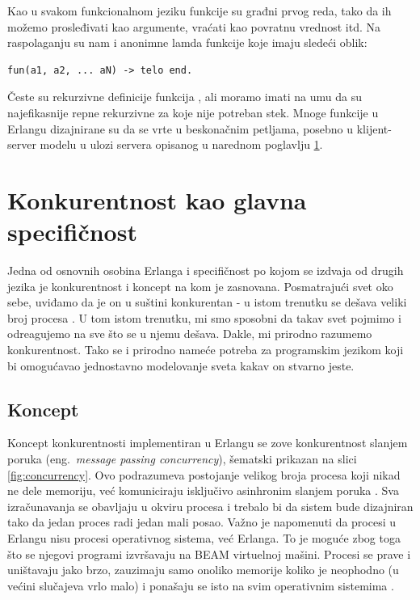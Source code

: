 \documentclass[a4paper]{article}
\begin{document}
Kao u svakom funkcionalnom jeziku funkcije su građni prvog reda, 
tako da ih možemo prosleđivati kao argumente, vraćati kao povratnu vrednost itd. Na raspolaganju su nam i anonimne lamda funkcije koje imaju sledeći oblik:
\begin{verbatim}
fun(a1, a2, ... aN) -> telo end.
\end{verbatim}

Česte su rekurzivne definicije funkcija \cite{book_joe}, 
ali moramo imati na umu da su najefikasnije repne rekurzivne za koje nije potreban stek. 
Mnoge funkcije u Erlangu dizajnirane su da se vrte u beskonačnim petljama, 
posebno u klijent-server modelu u ulozi servera opisanog u narednom poglavlju \ref{sec:konkurentnost}.


\section{Konkurentnost kao glavna specifičnost}
\label{sec:konkurentnost}
Jedna od osnovnih osobina Erlanga i specifičnost po kojom se izdvaja od drugih jezika je konkurentnost i koncept na kom je zasnovana.
Posmatrajući svet oko
sebe, uviđamo da je on u suštini konkurentan - u istom trenutku se dešava veliki broj procesa \cite{phdthesis}. 
U tom istom trenutku, mi smo sposobni da takav svet pojmimo i odreagujemo na sve što se u njemu dešava. Dakle, mi prirodno razumemo konkurentnost.
Tako se i prirodno nameće potreba za programskim jezikom koji bi omogućavao jednostavno modelovanje sveta kakav on stvarno jeste.

\subsection{Koncept}
Koncept konkurentnosti implementiran u Erlangu se zove konkurentnost slanjem poruka (eng.~{\em message passing concurrency}), šematski prikazan na slici \ref{fig:concurrency}. Ovo podrazumeva postojanje velikog broja procesa koji nikad ne dele memoriju, već komuniciraju isključivo asinhronim slanjem poruka \cite{book_joe}.
Sva izračunavanja se obavljaju u okviru procesa i trebalo bi da sistem bude dizajniran tako da jedan proces radi jedan mali posao.
Važno je napomenuti da procesi u Erlangu nisu procesi operativnog sistema, već Erlanga.
To je moguće zbog toga što se njegovi programi izvršavaju na BEAM virtuelnoj mašini.
Procesi se prave i uništavaju jako brzo, zauzimaju samo onoliko memorije koliko je neophodno (u većini slučajeva vrlo malo)
i ponašaju se isto na svim operativnim sistemima \cite{book_joe}.
\end{document}
